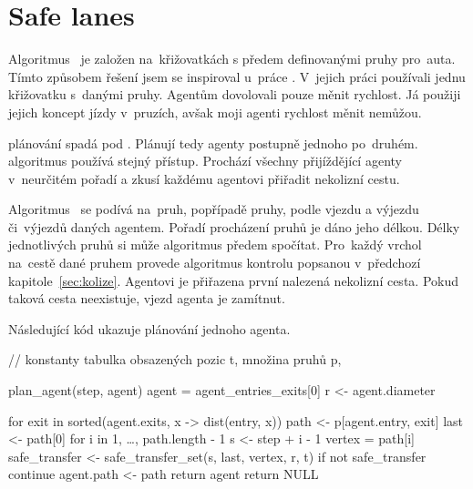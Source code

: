 \section{Safe lanes}\label{sec:safe_lanes}



Algoritmus~ je založen na~křižovatkách s předem definovanými pruhy pro~auta.
Tímto způsobem řešení jsem se inspiroval u~práce \citet{Dresner}.
V~jejich práci používali jednu křižovatku s~danými pruhy.
Agentům dovolovali pouze měnit rychlost.
Já použiji jejich koncept jízdy v~pruzích, avšak moji agenti rychlost měnit nemůžou.

\citet{Dresner} plánování spadá pod .
Plánují tedy agenty postupně jednoho po~druhém.
 algoritmus používá stejný přístup.
Prochází všechny přijíždějící agenty v~neurčitém pořadí a zkusí každému agentovi přiřadit nekolizní cestu.

Algoritmus~ se podívá na~pruh, popřípadě pruhy, podle vjezdu a výjezdu či~výjezdů daných agentem.
Pořadí procházení pruhů je dáno jeho délkou.
Délky jednotlivých pruhů si může algoritmus předem spočítat.
Pro~každý vrchol na~cestě dané pruhem provede algoritmus kontrolu popsanou v~předchozí kapitole~\ref{sec:kolize}.
Agentovi je přiřazena první nalezená nekolizní cesta.
Pokud taková cesta neexistuje, vjezd agenta je zamítnut.

Následující kód ukazuje plánování jednoho agenta.
\begin{code}
// konstanty tabulka obsazených pozic t, množina pruhů p,

plan_agent(step, agent)
  agent = agent_entries_exits[0]
  r <- agent.diameter

  for exit in sorted(agent.exits, x -> dist(entry, x))
    path <- p[agent.entry, exit]
    last <- path[0]
    for i in 1, \ldots, path.length - 1
      s <- step + i - 1
      vertex = path[i]
      safe_transfer <- safe_transfer_set(s, last, vertex, r, t)
      if not safe_transfer
        continue
    agent.path <- path
    return agent
  return NULL
\end{code}

